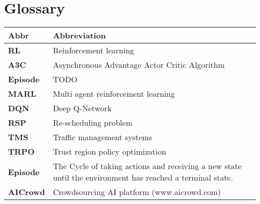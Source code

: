 %
%

\chapter*{Glossary}\label{chap.glossar}
\label{cha:abkürzungsverzeichnis}


\begin{longtable}{|m{3cm}|m{11cm}|}\hline	
	\rowcolor{gray} \textbf{Abbr}&
	Abbreviation \\ \hline

	\textbf{RL}&
	Reinforcement learning \\ \hline

	\textbf{A3C}&
	 Asynchronous Advantage Actor Critic Algorithm \\ \hline

	\textbf{Episode}&
	TODO \\ \hline

	\textbf{MARL}&
	Multi agent reinforcement learning \\ \hline

	\textbf{DQN}&
	Deep Q-Network \\ \hline

	\textbf{RSP}&
	Re-scheduling problem \\ \hline

	\textbf{TMS}&
	Traﬀic management systems \\ \hline

	\textbf{TRPO}&
	Trust region policy optimization \\ \hline


	\textbf{Episode}&
	The Cycle of taking actions and receiving a new state until the environment has reached a terminal state. \\ \hline


\textbf{AICrowd}&
Crowdsourcing AI platform (www.aicrowd.com)\\ \hline




	
\end{longtable}
